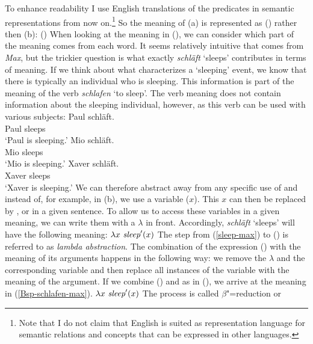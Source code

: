 \noindent
To enhance readability I use English translations of the predicates in semantic representations
from now on.\footnote{
  Note that I do not claim that English is suited as representation language for semantic relations
  and concepts that can be expressed in other languages.
}
So the meaning of (a) is represented as () rather then (b):
\ea
\label{sleep-max}
()
\z
When looking at the meaning in (), we can consider which part of the meaning comes from each word.
It seems relatively intuitive that  comes from \emph{Max}, but the trickier question is what exactly
\emph{schläft} `sleeps' contributes in terms of meaning. If we think about what characterizes a `sleeping' event, we
know that there is typically an individual who is sleeping. This information is part of the meaning of the verb \emph{schlafen}
`to sleep'. The verb meaning does not contain information about the sleeping individual, however, as this verb can be used
with various subjects:
 \eal
\ex 
\gll Paul schläft.\\
     Paul sleeps\\
\glt `Paul is sleeping.'
\ex 
\gll Mio schläft.\\
     Mio sleeps\\
\glt `Mio is sleeping.'
\ex 
\gll Xaver schläft.\\
     Xaver sleeps\\
\glt `Xaver is sleeping.'
\zl
We can therefore abstract away from any specific use of  and instead of, for example,  in (b), we
use a variable (\eg $x$). This $x$ can then be replaced by ,  or  in a given sentence. To allow us
to access these variables in a given meaning, we can write them with a $\lambda$ in front. Accordingly, \emph{schläft} `sleeps' will have
the following meaning:
\ea
$\lambda x~\textit{sleep}'(x)$
\z
%
The step from (\ref{sleep-max}) to () is referred to as \emph{lambda abstraction}.
The combination of the expression () with the meaning of its arguments happens in the following way: we remove the $\lambda$ and the 
corresponding variable and then replace all instances of the variable with the meaning of the
argument. If we combine () and  as in (),
we arrive at the meaning in (\ref{Bsp-schlafen-max}). 
\ea
$\lambda x~\textit{sleep}'(x)$    
\z
The process is called $\beta$"=reduction or 
